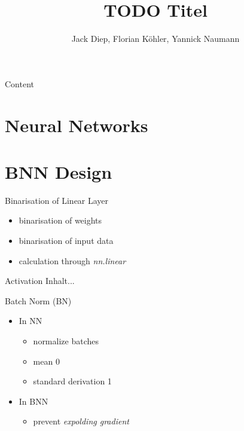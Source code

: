 \documentclass[aspectratio=1610, 12pt]{beamer}
\title{TODO Titel}
\author[Diep, Köhler, Naumann]{Jack Diep, Florian Köhler, Yannick Naumann}
\institute[BNN-Training]{Design Your Own CPU - Design of Embedded Systems}
\begin{document}
\maketitle




\begin{frame}{Content}
\tableofcontents


\end{frame}
\section{Neural Networks}

\section{BNN Design}
\begin{frame}{Binarisation of Linear Layer}
\begin{itemize}
	\item binarisation of weights
	\item binarisation of input data
	\item calculation through \textit{nn.linear}
\end{itemize}
\end{frame}
\begin{frame}{Activation}
Inhalt...
\end{frame}
\begin{frame}{Batch Norm (BN)}
\begin{itemize}
	\item In NN
	\begin{itemize}
		\item normalize batches 
		\item mean 0
		\item standard derivation 1 
	\end{itemize}
	\item In BNN 
	\begin{itemize}
		\item prevent \textit{expolding gradient} %
	\end{itemize}
\end{itemize}
\end{frame}
\end{document}
